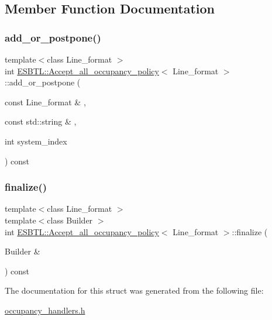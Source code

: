 \subsection{Member Function Documentation}
\mbox{\label{structESBTL_1_1Accept__all__occupancy__policy_a46d98fd520cace8a53c90df99f75764a}} 
\subsubsection{\texorpdfstring{add\+\_\+or\+\_\+postpone()}{add\_or\_postpone()}}
{\footnotesize\ttfamily template$<$class Line\+\_\+format $>$ \\
int \hyperlink{structESBTL_1_1Accept__all__occupancy__policy}{E\+S\+B\+T\+L\+::\+Accept\+\_\+all\+\_\+occupancy\+\_\+policy}$<$ Line\+\_\+format $>$\+::add\+\_\+or\+\_\+postpone (\begin{DoxyParamCaption}\item[{const Line\+\_\+format \&}]{,  }\item[{const std\+::string \&}]{,  }\item[{int}]{system\+\_\+index }\end{DoxyParamCaption}) const\hspace{0.3cm}{\ttfamily [inline]}}

\mbox{\label{structESBTL_1_1Accept__all__occupancy__policy_a71901c20a359729f33eddc04a1e84354}} 
\subsubsection{\texorpdfstring{finalize()}{finalize()}}
{\footnotesize\ttfamily template$<$class Line\+\_\+format $>$ \\
template$<$class Builder $>$ \\
int \hyperlink{structESBTL_1_1Accept__all__occupancy__policy}{E\+S\+B\+T\+L\+::\+Accept\+\_\+all\+\_\+occupancy\+\_\+policy}$<$ Line\+\_\+format $>$\+::finalize (\begin{DoxyParamCaption}\item[{Builder \&}]{ }\end{DoxyParamCaption}) const\hspace{0.3cm}{\ttfamily [inline]}}



The documentation for this struct was generated from the following file\+:\begin{DoxyCompactItemize}
\item 
\hyperlink{occupancy__handlers_8h}{occupancy\+\_\+handlers.\+h}\end{DoxyCompactItemize}
